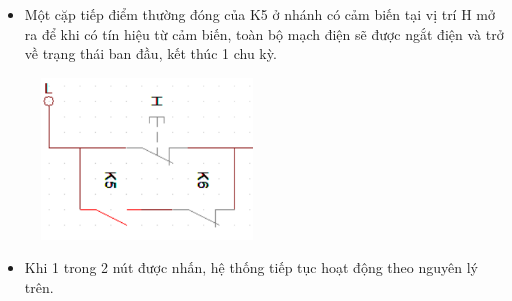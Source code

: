 \begin{itemize}
    \item Một cặp tiếp điểm thường đóng của K5 ở nhánh có cảm biến tại vị trí H mở ra để khi có tín hiệu từ cảm biến, toàn bộ mạch điện sẽ được ngắt điện và trở về trạng thái ban đầu, kết thúc 1 chu kỳ.
\end{itemize}
\begin{figure}[H]
    \centering
    \includegraphics[width=0.5\textwidth]{pictures/denH.png}
\end{figure}
\begin{itemize}
    \item Khi 1 trong 2 nút được nhấn, hệ thống tiếp tục hoạt động theo nguyên lý trên.
\end{itemize}
\cleardoublepage